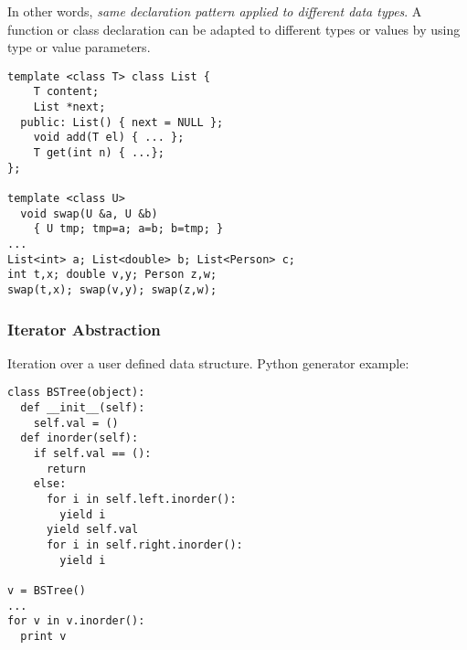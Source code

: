 In other words, \textit{same declaration pattern applied to different data types}. A function or class declaration can be adapted to different types or values by using type or value parameters.
\begin{listing}[H]

\begin{verbatim}
template <class T> class List {
	T content;
	List *next;
  public: List() { next = NULL };
	void add(T el) { ... };
	T get(int n) { ...};
};

template <class U>
  void swap(U &a, U &b)
    { U tmp; tmp=a; a=b; b=tmp; }
...
List<int> a; List<double> b; List<Person> c;
int t,x; double v,y; Person z,w;
swap(t,x); swap(v,y); swap(z,w);
\end{verbatim}
\caption{}
\label{code:code3}
\end{listing}

\subsubsection{Iterator Abstraction}

Iteration over a user defined data structure. Python generator example:
\begin{listing}[H]

\begin{verbatim}
class BSTree(object):
  def __init__(self):
    self.val = ()
  def inorder(self):
    if self.val == ():
      return
    else:
      for i in self.left.inorder():
        yield i
      yield self.val
      for i in self.right.inorder():
        yield i

v = BSTree()
...
for v in v.inorder():
  print v
\end{verbatim}
\caption{}
\label{code:code4}
\end{listing}

